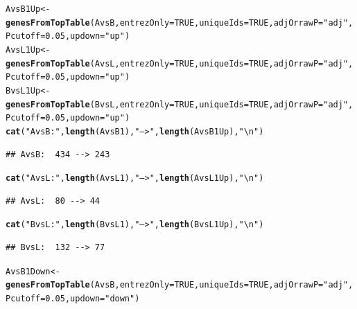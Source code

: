 \documentclass{article}\usepackage[]{graphicx}\usepackage[]{color}
\makeatletter
\newcommand{\hlnum}[1]{\textcolor[rgb]{0.686,0.059,0.569}{#1}}%
\newcommand{\hlstr}[1]{\textcolor[rgb]{0.192,0.494,0.8}{#1}}%
\newcommand{\hlstd}[1]{\textcolor[rgb]{0.345,0.345,0.345}{#1}}%
\newcommand{\hlkwb}[1]{\textcolor[rgb]{0.69,0.353,0.396}{#1}}%
\newcommand{\hlkwc}[1]{\textcolor[rgb]{0.333,0.667,0.333}{#1}}%
\newcommand{\hlkwd}[1]{\textcolor[rgb]{0.737,0.353,0.396}{\textbf{#1}}}%
\newenvironment{kframe}{%
 \def\at@end@of@kframe{}%
 \ifinner\ifhmode%
  \def\at@end@of@kframe{\end{minipage}}%
  \begin{minipage}{\columnwidth}%
 \fi\fi%
 \def\FrameCommand##1{\hskip\@totalleftmargin \hskip-\fboxsep
 \colorbox{shadecolor}{##1}\hskip-\fboxsep
     \hskip-\linewidth \hskip-\@totalleftmargin \hskip\columnwidth}%
 \MakeFramed {\advance\hsize-\width
   \@totalleftmargin\z@ \linewidth\hsize
   \@setminipage}}%
 {\par\unskip\endMakeFramed%
 \at@end@of@kframe}
\newenvironment{knitrout}{}{} %
\makeatother
\begin{document}
\begin{enumerate}
\begin{knitrout}
\color{fgcolor}\begin{kframe}
\begin{alltt}
\hlstd{AvsB1Up}  \hlkwb{<-} \hlkwd{genesFromTopTable} \hlstd{(AvsB,} \hlkwc{entrezOnly} \hlstd{=} \hlnum{TRUE}\hlstd{,} \hlkwc{uniqueIds}\hlstd{=}\hlnum{TRUE}\hlstd{,} \hlkwc{adjOrrawP} \hlstd{=} \hlstr{"adj"}\hlstd{,} \hlkwc{Pcutoff} \hlstd{=} \hlnum{0.05}\hlstd{,} \hlkwc{updown}\hlstd{=}\hlstr{"up"}\hlstd{)}
\hlstd{AvsL1Up}  \hlkwb{<-} \hlkwd{genesFromTopTable} \hlstd{(AvsL,} \hlkwc{entrezOnly} \hlstd{=} \hlnum{TRUE}\hlstd{,} \hlkwc{uniqueIds}\hlstd{=}\hlnum{TRUE}\hlstd{,} \hlkwc{adjOrrawP} \hlstd{=} \hlstr{"adj"}\hlstd{,} \hlkwc{Pcutoff} \hlstd{=} \hlnum{0.05}\hlstd{,} \hlkwc{updown}\hlstd{=}\hlstr{"up"}\hlstd{)}
\hlstd{BvsL1Up}  \hlkwb{<-} \hlkwd{genesFromTopTable} \hlstd{(BvsL,} \hlkwc{entrezOnly} \hlstd{=} \hlnum{TRUE}\hlstd{,} \hlkwc{uniqueIds}\hlstd{=}\hlnum{TRUE}\hlstd{,} \hlkwc{adjOrrawP} \hlstd{=} \hlstr{"adj"}\hlstd{,} \hlkwc{Pcutoff} \hlstd{=} \hlnum{0.05}\hlstd{,} \hlkwc{updown}\hlstd{=}\hlstr{"up"}\hlstd{)}
\hlkwd{cat}\hlstd{(}\hlstr{"AvsB: "}\hlstd{,} \hlkwd{length}\hlstd{(AvsB1),} \hlstr{"-->"}\hlstd{,} \hlkwd{length}\hlstd{(AvsB1Up),} \hlstr{"\textbackslash{}n"}\hlstd{)}
\end{alltt}
\begin{verbatim}
## AvsB:  434 --> 243
\end{verbatim}
\begin{alltt}
\hlkwd{cat}\hlstd{(}\hlstr{"AvsL: "}\hlstd{,} \hlkwd{length}\hlstd{(AvsL1),} \hlstr{"-->"}\hlstd{,} \hlkwd{length}\hlstd{(AvsL1Up),} \hlstr{"\textbackslash{}n"}\hlstd{)}
\end{alltt}
\begin{verbatim}
## AvsL:  80 --> 44
\end{verbatim}
\begin{alltt}
\hlkwd{cat}\hlstd{(}\hlstr{"BvsL: "}\hlstd{,} \hlkwd{length}\hlstd{(BvsL1),} \hlstr{"-->"}\hlstd{,} \hlkwd{length}\hlstd{(BvsL1Up),} \hlstr{"\textbackslash{}n"}\hlstd{)}
\end{alltt}
\begin{verbatim}
## BvsL:  132 --> 77
\end{verbatim}
\begin{alltt}
\hlstd{AvsB1Down}  \hlkwb{<-} \hlkwd{genesFromTopTable} \hlstd{(AvsB,} \hlkwc{entrezOnly} \hlstd{=} \hlnum{TRUE}\hlstd{,} \hlkwc{uniqueIds}\hlstd{=}\hlnum{TRUE}\hlstd{,} \hlkwc{adjOrrawP} \hlstd{=} \hlstr{"adj"}\hlstd{,} \hlkwc{Pcutoff} \hlstd{=} \hlnum{0.05}\hlstd{,} \hlkwc{updown}\hlstd{=}\hlstr{"down"}\hlstd{)}

\end{alltt}
\end{kframe}
\end{knitrout}
\end{enumerate}
\end{document}
